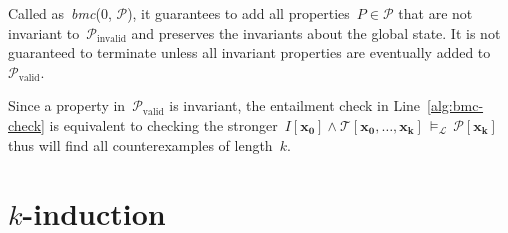 \documentclass[12pt]{article}
\renewcommand{\textproc}{\textsl}
\renewcommand{\vec}[1]{\mathbf{#1}}            %
\newcommand{\lo}{\mathcal{L}}                  %
\newcommand{\lent}{\,\models_\lo\,}            %
\begin{document}
Called as~\textproc{bmc}($0$, $\mathcal{P}$), it guarantees to add all properties~$P\in\mathcal{P}$ that are not invariant to~$\mathcal{P}_\mathrm{invalid}$ and preserves the invariants about the global state. It is not guaranteed to terminate unless all invariant properties are eventually added to~$\mathcal{P}_\mathrm{valid}$.

Since a property in~$\mathcal{P}_\mathrm{valid}$ is invariant, the entailment check in Line~\ref{alg:bmc-check} is equivalent to checking the stronger~${I[\vec{x_0}] \land \mathcal{T}[\vec{x_0,\dotsc,x_{k}}] \lent \mathcal{P}[\vec{x_{k}}]}$ thus will find all counterexamples of length~$k$.

\section{$k$-induction}
\label{sec:k-induction}
\end{document}
